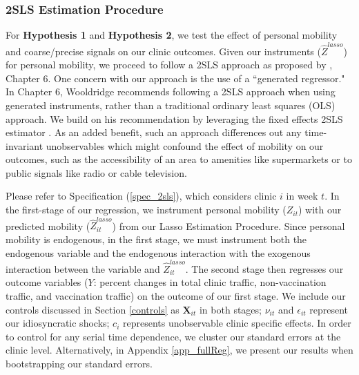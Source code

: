  \subsubsection{2SLS Estimation Procedure} \label{2sls}
 For \textbf{Hypothesis 1} and \textbf{Hypothesis 2}, we test the effect of personal mobility and coarse/precise signals on our clinic outcomes. Given our instruments ($\hat{Z}^{lasso}$) for personal mobility, we proceed to follow a 2SLS approach as proposed by \cite{Wooldridge2010}, Chapter 6. One concern with our approach is the use of a “generated regressor." In Chapter 6, Wooldridge recommends following a 2SLS approach when using generated instruments, rather than a traditional ordinary least squares (OLS) approach. We build on his recommendation by leveraging the fixed effects 2SLS estimator \citep[Chapter 11]{Wooldridge2010}. As an added benefit, such an approach differences out any time-invariant unobservables which might confound the effect of mobility on our outcomes, such as the accessibility of an area to amenities like supermarkets or to public signals like radio or cable television.
 
 Please refer to Specification (\ref{spec_2sls}), which considers clinic $i$ in week $t$. In the first-stage of our regression, we instrument personal mobility ($Z_{it}$) with our predicted mobility ($\hat{Z}_{it}^{lasso}$) from our Lasso Estimation Procedure. Since personal mobility is endogenous, in the first stage, we must instrument both the endogenous variable and the endogenous interaction with the exogenous interaction between the variable and $\hat{Z}_{it}^{lasso}$. The second stage then regresses our outcome variables ($Y$: percent changes in total clinic traffic, non-vaccination traffic, and vaccination traffic) on the outcome of our first stage. We include our controls discussed in Section \ref{controls} as $\boldsymbol{X}_{it}$ in both stages; $\nu_{it}$ and $\epsilon_{it}$ represent our idiosyncratic shocks; $c_i$ represents unobservable clinic specific effects. In order to control for any serial time dependence, we cluster our standard errors at the clinic level. Alternatively, in Appendix \ref{app_fullReg}, we present our results when bootstrapping our standard errors.

